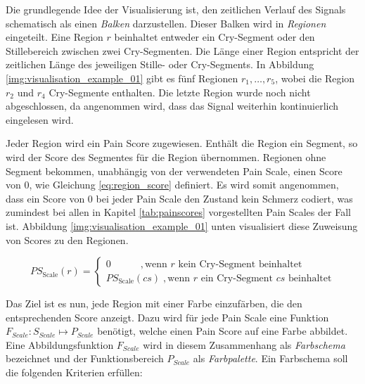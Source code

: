 Die grundlegende Idee der Visualisierung ist, den zeitlichen Verlauf des Signals schematisch als einen \emph{Balken} darzustellen. Dieser Balken wird in \emph{Regionen} eingeteilt. Eine Region $r$ beinhaltet entweder ein Cry-Segment oder den Stillebereich zwischen zwei Cry-Segmenten. Die Länge einer Region entspricht der zeitlichen Länge des jeweiligen Stille- oder Cry-Segments. In Abbildung \ref{img:visualisation_example_01} gibt es fünf Regionen $r_{1} , \ldots , r_5 $, wobei die Region $r_2$ und $r_4$ Cry-Segmente enthalten. Die letzte Region wurde noch nicht abgeschlossen, da angenommen wird, dass das Signal weiterhin kontinuierlich eingelesen wird.

Jeder Region wird ein Pain Score zugewiesen. Enthält die Region ein Segment, so wird der Score des Segmentes für die Region übernommen. Regionen ohne Segment bekommen, unabhängig von der verwendeten Pain Scale, einen Score von 0, wie Gleichung \ref{eq:region_score} definiert. Es wird somit angenommen, dass ein Score von 0 bei jeder Pain Scale den Zustand \glqq kein Schmerz\grqq{} codiert, was zumindest bei allen in Kapitel \ref{tab:painscores} vorgestellten Pain Scales der Fall ist. Abbildung \ref{img:visualisation_example_01} unten visualisiert diese Zuweisung von Scores zu den Regionen.

\begin{equation}
PS_{\text{Scale}}(r) = \begin{cases}
 0 \quad \quad \quad,  \text{wenn } r  \text{ kein Cry-Segment beinhaltet} \\
 PS_{\text{Scale}}(cs) \;, \text{wenn } r  \text{ ein Cry-Segment } cs \text{ beinhaltet}
 \end{cases}	
 \label{eq:region_score}
\end{equation}

Das Ziel ist es nun, jede Region mit einer Farbe einzufärben, die den entsprechenden Score anzeigt. Dazu wird für jede Pain Scale eine Funktion $F_{Scale}:S_{Scale} \mapsto P_{Scale}$ benötigt, welche einen Pain Score auf eine Farbe abbildet. Eine Abbildungsfunktion $F_{Scale}$ wird in diesem Zusammenhang als \emph{Farbschema} bezeichnet und der Funktionsbereich $P_{Scale}$ als \emph{Farbpalette}. Ein Farbschema soll die folgenden Kriterien erfüllen:

